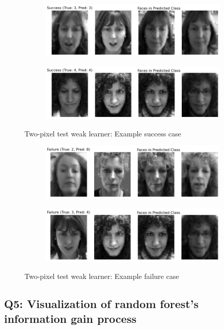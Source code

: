 \begin{figure}
	\centering
	\begin{subfigure}{0.45\linewidth}
		\centering
		\includegraphics[width=\linewidth]{image/q5-app/q5-two-succ1.png}
	\end{subfigure}%
	\quad
	\begin{subfigure}{0.45\linewidth}
		\centering
		\includegraphics[width=\linewidth]{image/q5-app/q5-two-succ2.png}
	\end{subfigure}
	\caption{Two-pixel test weak learner: Example success case}
\end{figure}
\begin{figure}
	\centering
	\begin{subfigure}{0.45\linewidth}
		\centering
		\includegraphics[width=\linewidth]{image/q5-app/q5-two-fail1.png}
	\end{subfigure}%
	\quad
	\begin{subfigure}{0.45\linewidth}
		\centering
		\includegraphics[width=\linewidth]{image/q5-app/q5-two-fail2.png}
	\end{subfigure}
	\caption{Two-pixel test weak learner: Example failure case}
\end{figure}

\subsection{Q5: Visualization of random forest's information gain process}
\label{subsec:Q5-2}